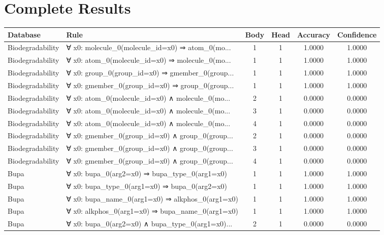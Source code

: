 \documentclass[11pt,a4paper]{article}
\begin{document}
\section{Complete Results}
\begin{table}[h!]
\centering
\tiny
\caption{All MARITA Rules - Complete Results}
\label{tab:all_rules}
\begin{longtable}{|l|p{6cm}|c|c|c|c|}
\hline
\textbf{Database} & \textbf{Rule} & \textbf{Body} & \textbf{Head} & \textbf{Accuracy} & \textbf{Confidence} \\
\hline
\endhead
Biodegradability & ∀ x0: molecule\_0(molecule\_id=x0) ⇒ atom\_0(mo... & 1 & 1 & 1.0000 & 1.0000 \\
Biodegradability & ∀ x0: atom\_0(molecule\_id=x0) ⇒ molecule\_0(mo... & 1 & 1 & 1.0000 & 1.0000 \\
Biodegradability & ∀ x0: group\_0(group\_id=x0) ⇒ gmember\_0(group... & 1 & 1 & 1.0000 & 1.0000 \\
Biodegradability & ∀ x0: gmember\_0(group\_id=x0) ⇒ group\_0(group... & 1 & 1 & 1.0000 & 1.0000 \\
Biodegradability & ∀ x0: atom\_0(molecule\_id=x0) ∧ molecule\_0(mo... & 2 & 1 & 0.0000 & 0.0000 \\
Biodegradability & ∀ x0: atom\_0(molecule\_id=x0) ∧ molecule\_0(mo... & 3 & 1 & 0.0000 & 0.0000 \\
Biodegradability & ∀ x0: atom\_0(molecule\_id=x0) ∧ molecule\_0(mo... & 4 & 1 & 0.0000 & 0.0000 \\
Biodegradability & ∀ x0: gmember\_0(group\_id=x0) ∧ group\_0(group... & 2 & 1 & 0.0000 & 0.0000 \\
Biodegradability & ∀ x0: gmember\_0(group\_id=x0) ∧ group\_0(group... & 3 & 1 & 0.0000 & 0.0000 \\
Biodegradability & ∀ x0: gmember\_0(group\_id=x0) ∧ group\_0(group... & 4 & 1 & 0.0000 & 0.0000 \\
Bupa & ∀ x0: bupa\_0(arg2=x0) ⇒ bupa\_type\_0(arg1=x0) & 1 & 1 & 1.0000 & 1.0000 \\
Bupa & ∀ x0: bupa\_type\_0(arg1=x0) ⇒ bupa\_0(arg2=x0) & 1 & 1 & 1.0000 & 1.0000 \\
Bupa & ∀ x0: bupa\_name\_0(arg1=x0) ⇒ alkphos\_0(arg1=x0) & 1 & 1 & 1.0000 & 1.0000 \\
Bupa & ∀ x0: alkphos\_0(arg1=x0) ⇒ bupa\_name\_0(arg1=x0) & 1 & 1 & 1.0000 & 1.0000 \\
Bupa & ∀ x0: bupa\_0(arg2=x0) ∧ bupa\_type\_0(arg1=x0)... & 2 & 1 & 0.0000 & 0.0000 \\

\end{longtable}
\end{table}
\end{document}
